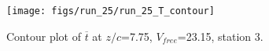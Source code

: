 \begin{figure}[H]
\centering
\texttt{[image: figs/run\_25/run\_25\_T\_contour]}
\caption{Contour plot of $\overline{t}$ at $z/c$=7.75, $V_{free}$=23.15, station 3.}
\label{fig:run_25_T_contour}
\end{figure}


